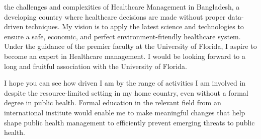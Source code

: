 \documentclass{article}
\begin{document}
the challenges and complexities of Healthcare Management in Bangladesh, a developing country where healthcare decisions are made without proper data-driven techniques. My vision is to apply the latest science and technologies to ensure a safe, economic, and perfect environment-friendly healthcare system. Under the guidance of the premier faculty at the University of Florida, I aspire to become an expert in Healthcare management. I would be looking forward to a long and fruitful association with the University of Florida.

I hope you can see how driven I am by the range of activities I am involved in despite the resource-limited setting in my home country, even without a formal degree in public health. Formal education in the relevant field from an international institute would enable me to make meaningful changes that help shape public health management to efficiently prevent emerging threats to public health. 
\end{document}
